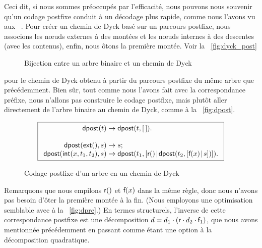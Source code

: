 Ceci dit, si nous sommes préoccupés par l'efficacité, nous pouvons
nous souvenir qu'un codage postfixe conduit à un décodage plus rapide, comme nous
l'avons vu aux
\figs~. 
Pour créer un chemin de Dyck basé sur un
parcours postfixe, nous associons les n{\oe}uds externes à des montées
et les n{\oe}uds internes à des descentes (avec les contenus), enfin,
nous ôtons la première montée. Voir la \fig~\vref{fig:dyck_post}
\begin{figure}[b]
\centering
{}
\qquad\quad
\subfloat[Chemin de Dyck correspondant au codage postfixe
$[\Box,\Box,\Box,2,1,\Box,\Box,3,0\char93$\label{fig:dyck_post}]{%
\texttt{[image: dyck\_post]}}
\caption{Bijection entre un arbre binaire et un chemin de Dyck}
\end{figure}
pour le chemin de Dyck obtenu à partir du parcours postfixe du même
arbre que précédemment. Bien sûr, tout comme nous l'avons fait avec la
correspondance préfixe, nous n'allons pas construire le codage
postfixe, mais plutôt
aller directement de l'arbre binaire au chemin de Dyck, comme à la
\fig~\vref{fig:dpost}.
\begin{figure}[t]
\begin{equation*}
\boxed{
\begin{array}{r@{\;}c@{\;}l}
\fun{dpost}(t) & \rightarrow & \fun{dpost}(t,\el).\\
\\
\fun{dpost}(\fun{ext}(),s) & \rightarrow & s;\\
\fun{dpost}(\fun{int}(x,t_1,t_2),s)
  & \rightarrow
  & \fun{dpost}(t_1,\cons{\fun{r}()}{\fun{dpost}(t_2,\cons{\fun{f}(x)}{s})}).
\end{array}}
\end{equation*}
\caption{Codage postfixe d'un arbre en un chemin
  de Dyck\label{fig:dpost}}
\end{figure}
Remarquons que nous empilons \(\textsf{r}()\) et \(\textsf{f}(x)\) dans la
même règle, donc nous n'avons pas besoin d'ôter la première montée à
la fin. (Nous employons une optimisation semblable avec
 à la \fig~\vref{fig:dpre}.) En
termes structurels, l'inverse de cette correspondance postfixe est une
décomposition \(d = d_1 \cdot (\textsf{r} \cdot d_2 \cdot \textsf{f}_1)\),
que nous avons mentionnée précédemment en passant comme étant une
option à la décomposition quadratique.

